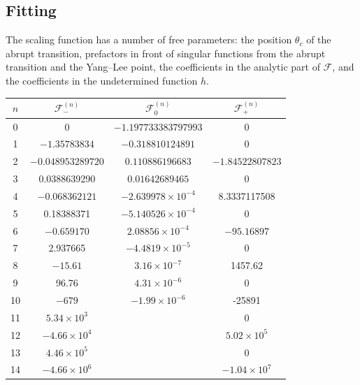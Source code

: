 \documentclass[
  aps,
  pre,
  preprint,
  longbibliography,
  floatfix
]{revtex4-2}
\begin{document}
\subsection{Fitting}

The scaling function has a number of free parameters: the position $\theta_c$ of the abrupt transition, prefactors in front of singular functions from the abrupt transition and the Yang--Lee point, the coefficients in the analytic part of $\mathcal F$, and the coefficients in the undetermined function $h$.

\begin{table}
  \begin{tabular}{c|ccc}
    $n$ & $\mathcal F_-^{(n)}$ & $\mathcal F_0^{(n)}$ & $\mathcal F_+^{(n)}$ \\\hline
    0   & 0                    & $-1.197733383797993$ & 0                    \\
    1   & $-1.35783834$        & $-0.318810124891$    & 0                    \\
    2   & $-0.048953289720$    & $0.110886196683$     & $-1.84522807823$     \\
    3   & 0.0388639290         & $0.01642689465$      & 0                    \\
    4   & $-0.068362121$       & $-2.639978\times10^{-4}$ & 8.3337117508     \\
    5   & 0.18388371           & $-5.140526\times10^{-4}$ & 0                \\
    6   & $-0.659170$          & $2.08856\times 10^{-4}$ & $-95.16897$       \\
    7   & 2.937665             & $-4.4819\times10^{-5}$  & 0                 \\
    8   & $-15.61$             & $3.16\times10^{-7}$  & 1457.62              \\
    9   & 96.76                & $4.31\times10^{-6}$  & 0                    \\
    10  & $-679$               & $-1.99\times10^{-6}$ & -25891               \\
    11  & $5.34\times10^3$     &                      & 0                    \\
    12  & $-4.66\times10^4$    &                      & $5.02\times10^5$     \\
    13  & $4.46\times10^5$     &                      & 0                    \\
    14  & $-4.66\times10^6$    &                      & $-1.04\times10^7$
  \end{tabular}
\end{table}
\end{document}

